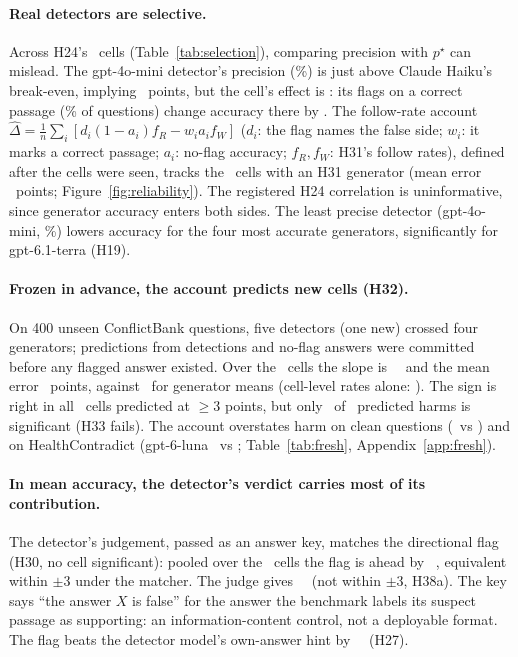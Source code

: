 \paragraph{Real detectors are selective.} Across H24's \hTwentyFourCells\ cells
(Table~\ref{tab:selection}), comparing precision with $p^\star$ can mislead. The gpt-4o-mini detector's precision
(\selHaikuMiniPrec\%) is just above Claude Haiku's break-even, implying \selHaikuMiniMarg\ points, but the cell's effect is
\selHaikuMiniObs: its flags on a correct passage (\selHaikuMiniWrongShare\% of questions) change accuracy there by
\selHaikuMiniWrongGain. The follow-rate account
$\hat\Delta=\frac1n\sum_i[d_i(1-a_i)f_R-w_ia_if_W]$ ($d_i$: the flag names the false side; $w_i$: it marks a correct
passage; $a_i$: no-flag accuracy; $f_R,f_W$: H31's follow rates), defined after the cells were seen, tracks the
\predEightN\ cells with an H31 generator (mean error \predEightMae\ points; Figure~\ref{fig:reliability}).
The registered H24 correlation is uninformative, since generator accuracy enters both sides. The least precise detector (gpt-4o-mini, \dirPrecMini\%) lowers accuracy for the four most
accurate generators, significantly for gpt-6.1-terra (H19).

\paragraph{Frozen in advance, the account predicts new cells (H32).} On 400 unseen ConflictBank questions, five
detectors (one new) crossed four generators; predictions from detections and no-flag answers were committed before
any flagged answer existed. Over the \frN\ cells the slope is \frSlope\ \frSlopeCI\ and the mean error \frMae\
points, against \frMaeGen\ for generator means (cell-level rates alone: \frMaeMarg). The sign is right in all
\frBigN\ cells predicted at $\ge$3 points, but only \frHarmConf\ of \frHarmN\ predicted harms is significant (H33 fails). The account overstates harm on clean questions (\frCleanPred\ vs \frCleanObs) and
on HealthContradict (gpt-6-luna \hcLlmPredLuna\ vs \hcLlmLuna; Table~\ref{tab:fresh}, Appendix~\ref{app:fresh}).

\paragraph{In mean accuracy, the detector's verdict carries most of its contribution.} The detector's judgement, passed as an answer key,
matches the directional flag (H30, no cell significant): pooled over the \PoolThirtyAK\ cells the flag
is ahead by \PoolThirtyA\ \PoolThirtyACI, equivalent within $\pm$3 under the matcher. The judge gives
\jdThirtyJ\ \jdThirtyJCI\ (not within $\pm$3, H38a). The key says ``the
answer $X$ is false'' for the answer the benchmark labels its suspect passage as supporting: an information-content
control, not a deployable format. The flag beats the detector model's own-answer
hint by \PoolThirtyB\ \PoolThirtyBCI\ (H27).

